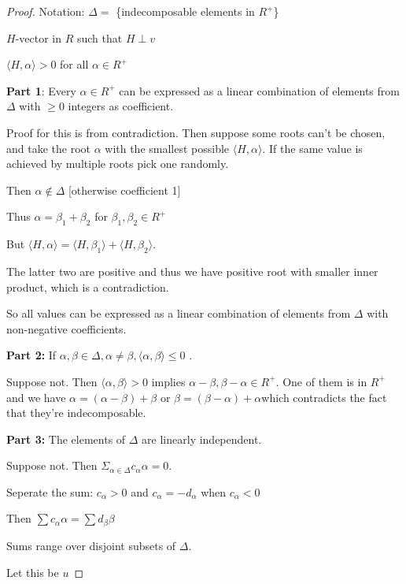 \documentclass{article}
\theoremstyle{definition}
\begin{document}
\begin{proof}
    Notation: \(\Delta =\) \{indecomposable elements in \(R^+\)\}

    \(H\)-vector in \(R\) such that \(H\perp v\) 

    \(\langle H,\alpha \rangle > 0\) for all \(\alpha \in R^+\) 
    
    \textbf{Part 1}: Every \(\alpha\in R^+\)  can be expressed as a linear combination of elements from \(\Delta\) with \(\geq 0\) integers as coefficient.

    Proof for this is from contradiction. Then suppose some roots can't be chosen, and take the root \(\alpha \) with the smallest possible \(\langle H,\alpha \rangle \). If the same value is achieved by multiple roots pick one randomly.

    Then \(\alpha \notin \Delta\) [otherwise coefficient 1]

    Thus \(\alpha =\beta_1 + \beta_2 \) for \(\beta_1,\beta_2 \in R^+\)
    
    But \(\langle H,\alpha \rangle = \langle H,\beta _1 \rangle + \langle H,\beta _2 \rangle \).

    The latter two are positive and thus we have positive root with smaller inner product, which is a contradiction.

    So all values can be expressed as a linear combination of elements from \(\Delta\) with non-negative coefficients.

    \textbf{Part 2:} If \(\alpha ,\beta \in \Delta , \alpha \neq \beta , \langle \alpha ,\beta  \rangle \leq 0\) .

    Suppose not. Then \(\langle \alpha ,\beta  \rangle >0\) implies \(\alpha - \beta,\beta -\alpha \in R^+\). One of them is in \(R^+\) and we have \(\alpha = (\alpha -\beta )+\beta \) or \(\beta = (\beta -\alpha )+\alpha\)which contradicts the fact that they're indecomposable.

    \textbf{Part 3:} The elements of \(\Delta \) are linearly independent.
    
    Suppose not. Then \(\Sigma_{\alpha \in \Delta}c_\alpha \alpha = 0\).

    Seperate the sum: \(c_\alpha >0\) and \(c_\alpha =-d_\alpha\) when \(c_\alpha < 0\) 

    Then \(\sum c_\alpha  \alpha  = \sum d_\beta \beta  \)
    
    Sums range over disjoint subsets of \(\Delta\).

    Let this be \(u\) 


\end{proof}
\end{document}
